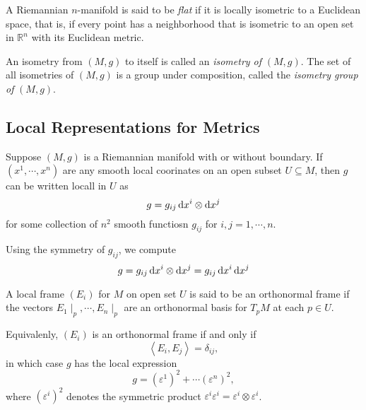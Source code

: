 \begin{definition}
  \label{definition-flat}
  A Riemannian \( n \)-manifold is said to be \emph{flat} if it is locally isometric to a Euclidean space, that is, if every point has a neighborhood that is isometric to an open set in \( \mathbb{R}^n \) with its Euclidean metric.
\end{definition}

\begin{definition}
  \label{definition-isometry-group}
  An isometry from \( (M, g) \) to itself is called an \emph{isometry of } \( (M, g) \).
  The set of all isometries of \( (M, g) \) is a group under composition, called the \emph{isometry group of} \( (M, g) \).
\end{definition}

\subsection{Local Representations for Metrics}
\label{subsection-local-Representations-for-metrics}

Suppose \( (M, g) \) is a Riemannian manifold with or without boundary.
If \( (x^1, \cdots, x^n) \) are any smooth local coorinates on an open subset \( U \subseteq M \), then \( g \) can be written locall in \( U \) as
\[
  g = g_{ij} \mathop{}\!\mathrm{d} x^i \otimes \mathop{}\!\mathrm{d} x^j
\]
for some collection of \( n^2 \) smooth functiosn \( g_{ij} \) for \( i, j = 1, \cdots, n \).

Using the symmetry of \( g_{ij} \), we compute
\[
    g = g_{ij} \mathop{}\!\mathrm{d} x^i \otimes \mathop{}\!\mathrm{d} x^j = g_{ij}\mathop{}\!\mathrm{d} x^i \mathop{}\!\mathrm{d} x^j
\]

\begin{definition}
  \label{definition-orthonormal-frame}
  A local frame \( (E_i) \) for \( M \) on open set \( U \) is said to be an orthonormal frame if the vectors \( E_1 \mid_p, \cdots, E_n \mid_p \) are an orthonormal basis for \( T_p M \) at each \( p \in U \).
\end{definition}

\begin{remark}
  \label{remark-orthonormal-frame}
  Equivalenly, \( (E_i) \) is an orthonormal frame if and only if
  \[
    \left\langle E_i, E_j \right\rangle = \delta_{ij},
  \]
  in which case \( g \) has the local expression
  \[
    g = (\varepsilon^1)^2 + \cdots (\varepsilon^n)^2,
  \]
  where \( (\varepsilon^i)^2 \) denotes the symmetric product \( \varepsilon^i \varepsilon^i = \varepsilon^i \otimes \varepsilon^i \).
\end{remark}

